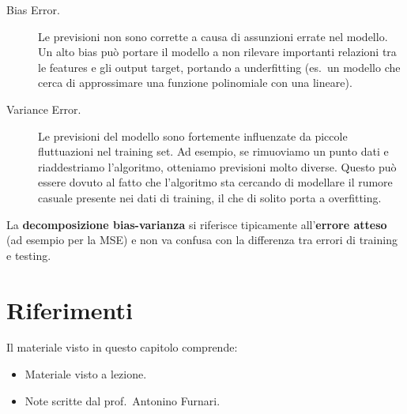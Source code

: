 \begin{description}
    \item[Bias Error.] Le previsioni non sono corrette a causa di assunzioni errate nel modello. Un alto bias pu\`o portare il modello a non rilevare importanti relazioni tra le features e gli output target, portando a underfitting (es.\ un modello che cerca di approssimare una funzione polinomiale con una lineare).
    \item[Variance Error.] Le previsioni del modello sono fortemente influenzate da piccole fluttuazioni nel training set. Ad esempio, se rimuoviamo un punto dati e riaddestriamo l'algoritmo, otteniamo previsioni molto diverse. Questo pu\`o essere dovuto al fatto che l'algoritmo sta cercando di modellare il rumore casuale presente nei dati di training, il che di solito porta a overfitting.
\end{description}

\noindent
La \textbf{decomposizione bias-varianza} si riferisce tipicamente all'\textbf{errore atteso} (ad esempio per la MSE) e non va confusa con la differenza tra errori di training e testing.

\section*{Riferimenti}

Il materiale visto in questo capitolo comprende:
\begin{itemize}
    \item Materiale visto a lezione.
    \item Note scritte dal prof.\ Antonino Furnari.
\end{itemize}
